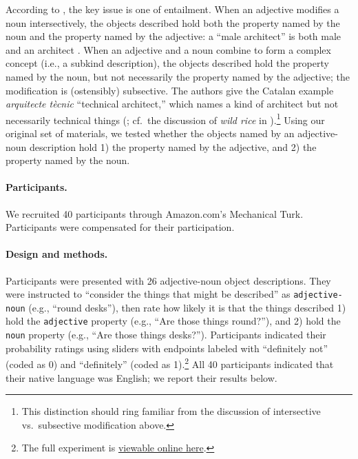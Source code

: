 \documentclass[12pt]{article}
\begin{document}
According to \citeauthor{McNally2004}, the key issue is one of entailment. When an adjective modifies a noun intersectively, the objects described hold both the property named by the noun and the property named by the adjective: a ``male architect'' is both male and an architect \citep[p.~179, ex.~2]{McNally2004}. When an adjective and a noun combine to form a complex concept (i.e., a subkind description), the objects described hold the property named by the noun, but not necessarily the property named by the adjective; the modification is (ostensibly) subsective. The authors give the Catalan example \emph{arquitecte t\`{e}cnic} ``technical architect,'' which names a kind of architect but not necessarily technical things (\citealp[p.~179, ex.~1]{McNally2004}; cf.~the discussion of \emph{wild rice} in \citealp{svenonius2008}).\footnote{This distinction should ring familiar from the discussion of intersective vs.~subsective modification above.} 
Using our original set of materials, we tested whether the objects named by an adjective-noun description hold 1) the property named by the adjective, and 2) the property named by the noun.




\paragraph{Participants.} We recruited 40 participants through Amazon.com's Mechanical Turk.  Participants were compensated for their participation.

\paragraph{Design and methods.} Participants were presented with 26 adjective-noun object descriptions. They were instructed to ``consider the things that might be described'' as \texttt{adjective-noun} (e.g., ``round desks''), then rate how likely it is that the things described 1) hold the \texttt{adjective} property (e.g., ``Are those things round?''), and 2) hold the \texttt{noun} property (e.g., ``Are those things desks?''). Participants indicated their probability ratings using sliders with endpoints labeled with ``definitely not'' (coded as 0) and ``definitely'' (coded as 1).\footnote{The full experiment is \href{http://web.stanford.edu/~scontras/adjective_ordering/experiments/9-concept-formability/concept-formability.html}{viewable online here}.} All 40 participants indicated that their native language was English; we report their results below.
\end{document}
